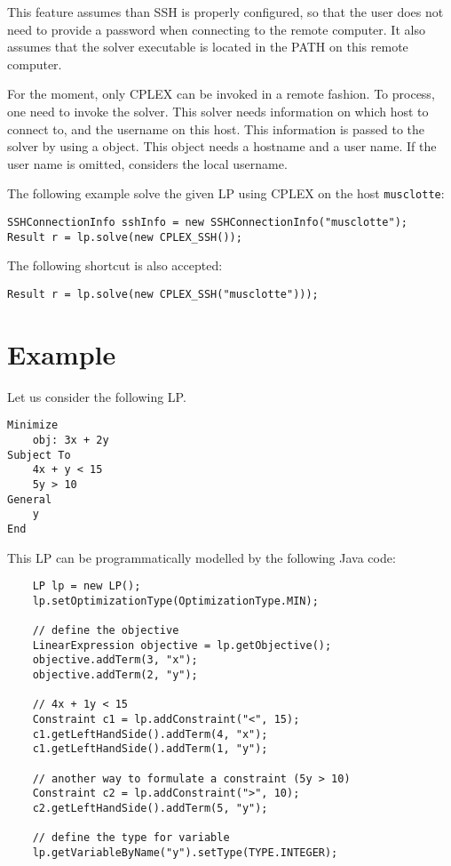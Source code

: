 \documentclass{article}
\begin{document}
This feature assumes than SSH is properly configured, so that the user does not need to provide a password when
connecting to the remote computer. It also assumes that the solver executable is located in the PATH on this
remote computer.

For the moment, only CPLEX can be invoked in a remote fashion. To process, one need to invoke the  solver. This solver
needs information on which host to connect to, and the username on this host. This information is passed to the solver
by using a  object. This object needs a hostname and a user name. If the user name is omitted,
\jalinopt considers the local username.

The following example solve the given LP using CPLEX on the host \texttt{musclotte}:
\begin{lstlisting}
SSHConnectionInfo sshInfo = new SSHConnectionInfo("musclotte");
Result r = lp.solve(new CPLEX_SSH());
\end{lstlisting}

The following shortcut is also accepted:

\begin{lstlisting}
Result r = lp.solve(new CPLEX_SSH("musclotte")));
\end{lstlisting}



\section{Example}

Let us consider the following LP.
\begin{lstlisting}
Minimize
	obj: 3x + 2y
Subject To
	4x + y < 15
	5y > 10
General
	y 
End
\end{lstlisting}

This LP can be programmatically modelled by the following Java code:


\begin{lstlisting}
	LP lp = new LP();
	lp.setOptimizationType(OptimizationType.MIN);
	
	// define the objective
	LinearExpression objective = lp.getObjective();
	objective.addTerm(3, "x");
	objective.addTerm(2, "y");

	// 4x + 1y < 15
	Constraint c1 = lp.addConstraint("<", 15);
	c1.getLeftHandSide().addTerm(4, "x");
	c1.getLeftHandSide().addTerm(1, "y");

	// another way to formulate a constraint (5y > 10)
	Constraint c2 = lp.addConstraint(">", 10);
	c2.getLeftHandSide().addTerm(5, "y");

	// define the type for variable
	lp.getVariableByName("y").setType(TYPE.INTEGER);
\end{lstlisting}
\end{document}
